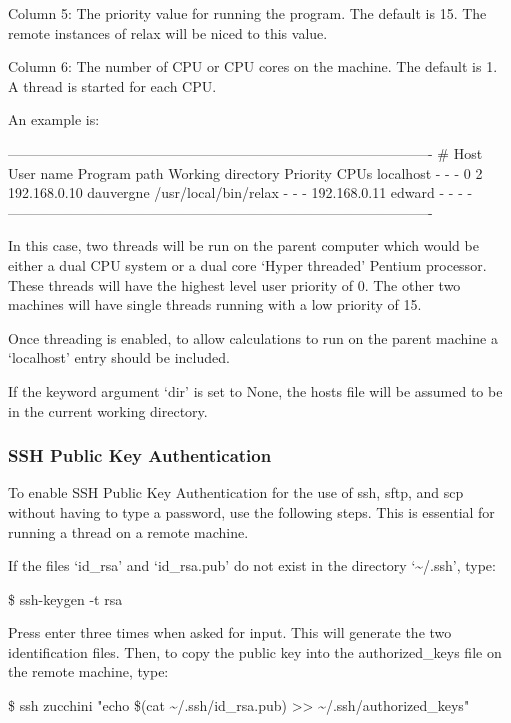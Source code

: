 Column 5:  The priority value for running the program.  The default is 15.  The remote
instances of relax will be niced to this value.

Column 6:  The number of CPU or CPU cores on the machine.  The default is 1.  A thread is
started for each CPU.

An example is:

-------------------------------------------------------------------------------------------
\# Host          User name       Program path            Working directory    Priority  CPUs
localhost       -               -                       -                    0         2
192.168.0.10    dauvergne       /usr/local/bin/relax    -                    -         -
192.168.0.11    edward          -                       -                    -         -
-------------------------------------------------------------------------------------------

In this case, two threads will be run on the parent computer which would be either a dual
CPU system or a dual core `Hyper threaded' Pentium processor.  These threads will have the
highest level user priority of 0.  The other two machines will have single threads running
with a low priority of 15.

Once threading is enabled, to allow calculations to run on the parent machine a `localhost'
entry should be included.


If the keyword argument `dir' is set to None, the hosts file will be assumed to be in the
current working directory.


\subsubsection{SSH Public Key Authentication}

To enable SSH Public Key Authentication for the use of ssh, sftp, and scp without having to
type a password, use the following steps.  This is essential for running a thread on a
remote machine.

If the files `id\_rsa' and `id\_rsa.pub' do not exist in the directory `\~{}/.ssh', type:

\$ ssh-keygen -t rsa

Press enter three times when asked for input.  This will generate the two identification
files.  Then, to copy the public key into the authorized\_keys file on the remote machine,
type:

\$ ssh zucchini "echo \$(cat \~{}/.ssh/id\_rsa.pub) >> \~{}/.ssh/authorized\_keys"

